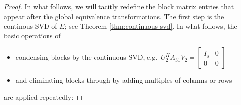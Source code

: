 \documentclass[]{book}
\providecommand{\tightlist}{%
  \setlength{\itemsep}{0pt}\setlength{\parskip}{0pt}}
\theoremstyle{definition}
\theoremstyle{definition}
\theoremstyle{definition}
\theoremstyle{definition}
\theoremstyle{remark}
\begin{document}
\begin{proof}
{}In what follows, we will tacitly redefine the block matrix entries that appear after the global equivalence transformations. The first step is the continous SVD of \(E\); see Theorem \ref{thm:continuous-svd}. In what follows, the basic operations of

\begin{itemize}
\tightlist
\item
  condensing blocks by the continuous SVD, e.g.~\(U_2^HA_{31}V_2=\begin{bmatrix} I_s & 0 \\ 0 & 0 \end{bmatrix}\)
\item
  and eliminating blocks through by adding multiples of columns or rows
\end{itemize}

are applied repeatedly:


\end{proof}
\end{document}
